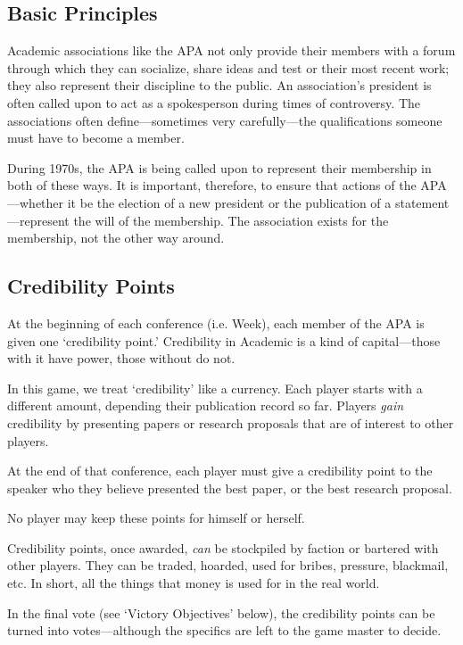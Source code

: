 \begin{refsection}
\section{Basic Principles}
\label{basicprinciples}

Academic associations like the APA not only provide their members with a forum through which they can socialize, share ideas and test or their most recent work; they also represent their discipline to the public. An association's president is often called upon to act as a spokesperson during times of controversy. The associations often define---sometimes very carefully---the qualifications someone must have to become a member.

During 1970s, the APA is being called upon to represent their membership in both of these ways. It is important, therefore, to ensure that actions of the APA---whether it be the election of a new president or the publication of a statement---represent the will of the membership. The association exists for the membership, not the other way around.

\subsection{Credibility Points}
\label{credibilitypoints}

At the beginning of each conference (i.e. Week), each member of the APA is given one `credibility point.' Credibility in Academic is a kind of capital---those with it have power, those without do not.

In this game, we treat `credibility' like a currency. Each player starts with a different amount, depending their publication record so far. Players \emph{gain} credibility by presenting papers or research proposals that are of interest to other players. 

At the end of that conference, each player must give a credibility point to the speaker who they believe presented the best paper, or the best research proposal.

No player may keep these points for himself or herself. 

Credibility points, once awarded, \emph{can} be stockpiled by faction or bartered with other players. They can be traded, hoarded, used for bribes, pressure, blackmail, etc. In short, all the things that money is used for in the real world.

In the final vote (see `Victory Objectives' below), the credibility points can be turned into votes---although the specifics are left to the game master to decide. 


\end{refsection}
